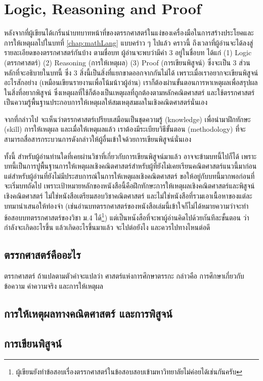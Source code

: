 \chapter{Logic, Reasoning and Proof}

หลังจากที่ผู้เขียนได้เกริ่นนำบทบาทหน้าที่ของตรรกศาสตร์ในแง่ของเครื่องมือในการสร้างประโยคและการให้เหตุผลไปในบทที่ \ref{chap:mathLang} แบบคร่าว ๆ ไปแล้ว
คราวนี้ ถึงเวลาที่ผู้อ่านจะได้ลงสู่รายละเอียดของตรรกศาสตร์กันบ้าง
ตามชื่อบท ผู้อ่านจะพบว่ามีคำ 3 อยู่ในชื่อบท ได้แก่ (1) Logic (ตรรกศาสตร์) (2) Reasoning (การให้เหตุผล) (3) Proof (การเขียนพิสูจน์) ซึ่งจะเป็น 3 ส่วนหลักที่จะอธิบายในบทนี้ ซึ่ง 3 สิ่งนี้เป็นสิ่งที่แยกขาดออกจากกันไม่ได้ เพราะเมื่อเราอยากจะเขียนพิสูจน์อะไรสักอย่าง (เหมือนเขียนรายงานเพื่อโน้มน้าวผู้อ่าน) เราก็ต้องผ่านขั้นตอนการหาเหตุผลเพื่อสรุปผลในสิ่งที่อยากพิสูจน์ ซึ่งเหตุผลที่ใช้ก็ต้องเป็นเหตุผลที่ถูกต้องตามหลักคณิตศาสตร์ และใช้ตรรกศาสตร์เป็นความรู้พื้นฐานประกอบการให้เหตุผลให้สมเหตุสมผลในเชิงคณิตศาสตร์นั่นเอง

จากที่กล่าวไป จะเห็นว่าตรรกศาสตร์เปรียบเสมือนเป็นชุดความรู้ (knowledge) เพื่อนำมาฝึกทักษะ (skill) การให้เหตุผล และเมื่อให้เหตุผลแล้ว เราต้องมีระเบียบวิธีขั้นตอน (methodology) ที่จะสามารถสื่อสารกระบวนการดังกล่าวให้ผู้อื่นเข้าใจด้วยการเขียนพิสูจน์นั่นเอง

ทั้งนี้ สำหรับผู้อ่านท่านใดที่เคยผ่านวิชาที่เกี่ยวกับการเขียนพิสูจน์มาแล้ว อาจจะข้ามบทนี้ไปก็ได้ เพราะบทนี้เป็นการปูพื้นฐานการให้เหตุผลเชิงคณิตศาสตร์สำหรับผู้ที่ยังไม่เคยเรียนคณิตศาสตร์แนวนี้มาก่อน
แต่สำหรับผู้อ่านที่ยังไม่มีประสบการณ์ในการให้เหตุผลเชิงคณิตศาสตร์ ขอให้อยู่กับบทนี้มากพอก่อนที่จะเริ่มบทถัดไป เพราะเป้าหมายหลักของหนังสือนี้คือฝึกทักษะการให้เหตุผลเชิงคณิตศาสตร์และพิสูจน์เชิงคณิตศาสตร์ ไม่ใช่หนังสือเตรียมสอบวิชาคณิตศาสตร์ และไม่ใช่หนังสือที่รวมเอาเนื้อหาของแต่ละบทมานำเสนอให้ท่องจำ (เช่นอ่านบทตรรกศาสตร์ของหนังสือเล่มนี้เข้าใจก็ไม่ได้หมายความว่าจะทำข้อสอบบทตรรกศาสตร์ของวิชา ม.4 ได้\footnote{ผู้เขียนยังทำข้อสอบเรื่องตรรกศาสตร์ในข้อสอบสอบเข้ามหาวิทยาลัยไม่ค่อยได้เช่นกันครับ}) แต่เป็นหนังสือที่จะพาผู้อ่านคิดไปด้วยกันทีละขั้นตอน ว่ากำลังจะเกิดอะไรขึ้น แล้วเกิดอะไรขึ้นมาแล้ว จะไปต่อยังไง และควรไปทางไหนต่อดี

\section{ตรรกศาสตร์คืออะไร}

ตรรกศาสตร์ ถ้าแปลตามตัวคำจะแปลว่า ศาสตร์แห่งการศึกษาตรรกะ กล่าวคือ การศึกษาเกี่ยวกับข้อความ ค่าความจริง และการให้เหตุผล



\section{การให้เหตุผลทางคณิตศาสตร์ และการพิสูจน์}





\section{การเขียนพิสูจน์}
















